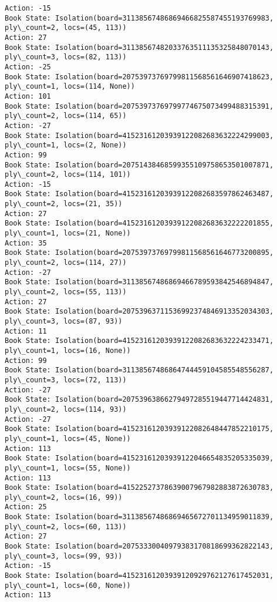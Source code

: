 \documentclass[11pt]{article}
\begin{document}
\begin{Verbatim}[commandchars=\\\{\}]
Action: -15
Book State: Isolation(board=31138567486869466825587455193769983, ply\_count=2, locs=(45, 113))
Action: 27
Book State: Isolation(board=31138567482033763511135325848070143, ply\_count=3, locs=(82, 113))
Action: -25
Book State: Isolation(board=20753973769799811568561646907418623, ply\_count=1, locs=(114, None))
Action: 101
Book State: Isolation(board=20753973769799774675073499488315391, ply\_count=2, locs=(114, 65))
Action: -27
Book State: Isolation(board=41523161203939122082683632224299003, ply\_count=1, locs=(2, None))
Action: 99
Book State: Isolation(board=20751438468599355109758653501007871, ply\_count=2, locs=(114, 101))
Action: -15
Book State: Isolation(board=41523161203939122082683597862463487, ply\_count=2, locs=(21, 35))
Action: 27
Book State: Isolation(board=41523161203939122082683632222201855, ply\_count=1, locs=(21, None))
Action: 35
Book State: Isolation(board=20753973769799811568561646773200895, ply\_count=2, locs=(114, 27))
Action: -27
Book State: Isolation(board=31138567486869466789593842546894847, ply\_count=2, locs=(55, 113))
Action: 27
Book State: Isolation(board=20753963711536992374846913352034303, ply\_count=3, locs=(87, 93))
Action: 11
Book State: Isolation(board=41523161203939122082683632224233471, ply\_count=1, locs=(16, None))
Action: 99
Book State: Isolation(board=31138567486864744459104585548556287, ply\_count=3, locs=(72, 113))
Action: -27
Book State: Isolation(board=20753963866279497285519447714424831, ply\_count=2, locs=(114, 93))
Action: -27
Book State: Isolation(board=41523161203939122082648447852210175, ply\_count=1, locs=(45, None))
Action: 113
Book State: Isolation(board=41523161203939122046654835205335039, ply\_count=1, locs=(55, None))
Action: 113
Book State: Isolation(board=41522527378639007967982883872630783, ply\_count=2, locs=(16, 99))
Action: 25
Book State: Isolation(board=31138567486869465672701134959011839, ply\_count=2, locs=(60, 113))
Action: 27
Book State: Isolation(board=20753330040979383170818699362822143, ply\_count=3, locs=(99, 93))
Action: -15
Book State: Isolation(board=41523161203939120929762127617452031, ply\_count=1, locs=(60, None))
Action: 113

    \end{Verbatim}


    
    
    
    
\end{document}
